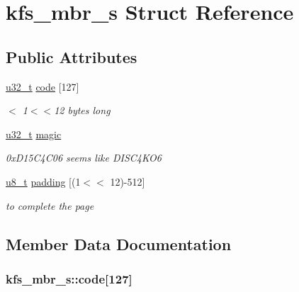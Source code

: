 \hypertarget{structkfs__mbr__s}{\section{kfs\-\_\-mbr\-\_\-s Struct Reference}
\label{structkfs__mbr__s}
}
\subsection*{Public Attributes}
\begin{DoxyCompactItemize}
\item 
\hyperlink{kfs_8c_a0c0a490ab7fa397be6c764a935cc5ea4}{u32\-\_\-t} \hyperlink{structkfs__mbr__s_aad17861e29b6c67d4cf286693c4b2d05}{code} \mbox{[}127\mbox{]}
\begin{DoxyCompactList}\small\item\em $<$ 1$<$$<$12 bytes long \end{DoxyCompactList}\item 
\hyperlink{kfs_8c_a0c0a490ab7fa397be6c764a935cc5ea4}{u32\-\_\-t} \hyperlink{structkfs__mbr__s_a3dc738aebe7f868555fdbf3375212417}{magic}
\begin{DoxyCompactList}\small\item\em 0x\-D15\-C4\-C06 seems like D\-I\-S\-C4\-K\-O6 \end{DoxyCompactList}\item 
\hyperlink{kfs_8c_ae081489b4906f65a3cb18e9fbe9f8d23}{u8\-\_\-t} \hyperlink{structkfs__mbr__s_aee8bfa85ff1245b61104044fb9a7337d}{padding} \mbox{[}(1$<$$<$ 12)-\/512\mbox{]}
\begin{DoxyCompactList}\small\item\em to complete the page \end{DoxyCompactList}\end{DoxyCompactItemize}


\subsection{Member Data Documentation}
\hypertarget{structkfs__mbr__s_aad17861e29b6c67d4cf286693c4b2d05}{
\subsubsection[{code}]{ kfs\-\_\-mbr\-\_\-s\-::code\mbox{[}127\mbox{]}}}\label{structkfs__mbr__s_aad17861e29b6c67d4cf286693c4b2d05}



